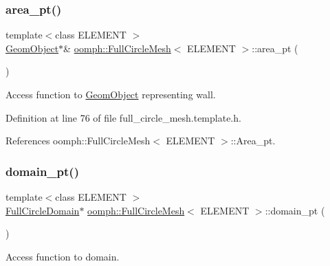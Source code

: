 \subsubsection{\texorpdfstring{area\+\_\+pt()}{area\_pt()}}
{\footnotesize\ttfamily template$<$class E\+L\+E\+M\+E\+NT $>$ \\
\hyperlink{classoomph_1_1GeomObject}{Geom\+Object}$\ast$\& \hyperlink{classoomph_1_1FullCircleMesh}{oomph\+::\+Full\+Circle\+Mesh}$<$ E\+L\+E\+M\+E\+NT $>$\+::area\+\_\+pt (\begin{DoxyParamCaption}{ }\end{DoxyParamCaption})\hspace{0.3cm}{\ttfamily [inline]}}



Access function to \hyperlink{classoomph_1_1GeomObject}{Geom\+Object} representing wall. 



Definition at line 76 of file full\+\_\+circle\+\_\+mesh.\+template.\+h.



References oomph\+::\+Full\+Circle\+Mesh$<$ E\+L\+E\+M\+E\+N\+T $>$\+::\+Area\+\_\+pt.

\mbox{\label{classoomph_1_1FullCircleMesh_aade9e5e2a9d65f8b7f5d041da4536d99}} 
\subsubsection{\texorpdfstring{domain\+\_\+pt()}{domain\_pt()}\hspace{0.1cm}{\footnotesize\ttfamily [1/2]}}
{\footnotesize\ttfamily template$<$class E\+L\+E\+M\+E\+NT $>$ \\
\hyperlink{classoomph_1_1FullCircleDomain}{Full\+Circle\+Domain}$\ast$ \hyperlink{classoomph_1_1FullCircleMesh}{oomph\+::\+Full\+Circle\+Mesh}$<$ E\+L\+E\+M\+E\+NT $>$\+::domain\+\_\+pt (\begin{DoxyParamCaption}{ }\end{DoxyParamCaption})\hspace{0.3cm}{\ttfamily [inline]}}



Access function to domain. 



